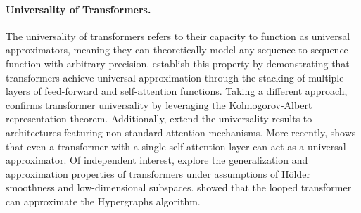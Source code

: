 \paragraph{Universality of Transformers.}
The universality of transformers refers to their capacity to function as universal approximators, meaning they can theoretically model any sequence-to-sequence function with arbitrary precision. \cite{ybr+20} establish this property by demonstrating that transformers achieve universal approximation through the stacking of multiple layers of feed-forward and self-attention functions. Taking a different approach, \cite{jl23} confirms transformer universality by leveraging the Kolmogorov-Albert representation theorem. Additionally, \cite{adtk23} extend the universality results to architectures featuring non-standard attention mechanisms. More recently, \cite{ks24} shows that even a transformer with a single self-attention layer can act as a universal approximator. Of independent interest, \cite{hl24} explore the generalization and approximation properties of transformers under assumptions of Hölder smoothness and low-dimensional subspaces. \cite{lll+25_loop} showed that the looped transformer can approximate the Hypergraphs algorithm.